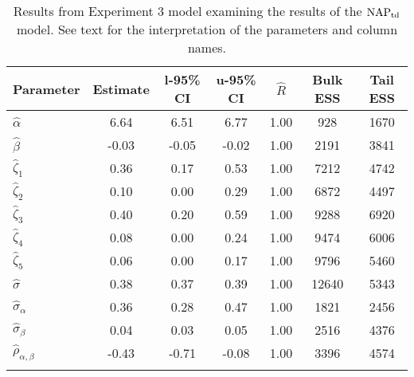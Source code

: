 \begin{table}

\caption{Results from Experiment 3 model examining the results of the $\operatorname{NAP}_{\text{td}}$ model. \label{tab:Experiment 3-NAPtd}See text for the interpretation of the parameters and column names.}

\begin{tabular}{l *3{S[table-format=-1.2]} S[table-format=1.2] *2{S[table-format=5.0]}}
\lsptoprule
Parameter & {Estimate} & {l-95\% CI} & {u-95\% CI} & {$\hat{R}$} & {Bulk ESS} & {Tail ESS}\\
\midrule
$\hat\alpha$ & 6.64 & 6.51 & 6.77 & 1.00 & 928 & 1670\\
$\hat\beta$ & -0.03 & -0.05 & -0.02 & 1.00 & 2191 & 3841\\
$\hat\zeta_{1}$ & 0.36 & 0.17 & 0.53 & 1.00 & 7212 & 4742\\
$\hat\zeta_{2}$ & 0.10 & 0.00 & 0.29 & 1.00 & 6872 & 4497\\
$\hat\zeta_{3}$ & 0.40 & 0.20 & 0.59 & 1.00 & 9288 & 6920\\
$\hat\zeta_{4}$ & 0.08 & 0.00 & 0.24 & 1.00 & 9474 & 6006\\
$\hat\zeta_{5}$ & 0.06 & 0.00 & 0.17 & 1.00 & 9796 & 5460\\
$\hat\sigma$ & 0.38 & 0.37 & 0.39 & 1.00 & 12640 & 5343\\
$\hat\sigma_{\alpha}$ & 0.36 & 0.28 & 0.47 & 1.00 & 1821 & 2456\\
$\hat\sigma_{\beta}$ & 0.04 & 0.03 & 0.05 & 1.00 & 2516 & 4376\\
$\hat\rho_{\alpha,\beta}$ & -0.43 & -0.71 & -0.08 & 1.00 & 3396 & 4574\\
\lspbottomrule
\end{tabular}

\end{table}


